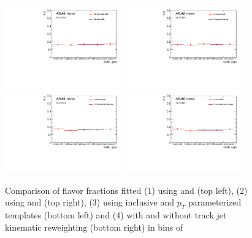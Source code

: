 \begin{figure}[htbp]
  \centering
 \includegraphics[width=0.45\textwidth]{figures/gbb/Sub_Sd0_Fits/Canv_dphi_leadCrossCheck.pdf}
 \includegraphics[width=0.45\textwidth]{figures/gbb/Sub_Sd0_Fits/Canv_dphi_subsubCrossCheck.pdf}\\
 \includegraphics[width=0.45\textwidth]{figures/gbb/Sub_Sd0_Fits/Canv_dphi_ptbinCrossCheck.pdf}
 \includegraphics[width=0.45\textwidth]{figures/gbb/Sub_Sd0_Fits/Canv_dphi_noreweightCrossCheck.pdf}\\
\caption{Comparison of flavor fractions fitted (1) using \subsdzero and \sdzero (top left), (2) using \subsdzero and \subsubsdzero (top right), (3) using inclusive and $p_T$ parameterized templates (bottom left) and (4) with and without track jet kinematic reweighting (bottom right) in bins of \dphi}
  \label{fig:dphi-fitfrac-crosscheck}
\end{figure}


